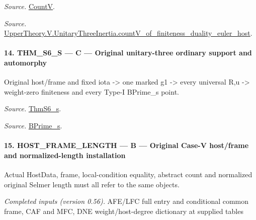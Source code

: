 \documentclass[11pt,a4paper]{article}
\numberwithin{equation}{section}
\theoremstyle{remark}\newtheorem{remark}[theorem]{Remark}
\begin{document}
\emph{Source.} \href{https://github.com/CocoSgt/riemann-hypothesis-lean/blob/7cbf7a0c32fca1badf05931879a37c3f8a2b03b4/src/Development/AutomorphicArithmetic/AutomorphicVarieties/HeightAndVanishing/Counts.lean#L69-L69}{CountV}.

\emph{Source.} \href{https://github.com/CocoSgt/riemann-hypothesis-lean/blob/7cbf7a0c32fca1badf05931879a37c3f8a2b03b4/src/Development/AutomorphicArithmetic/AutomorphicVarieties/ModularityArgument/ThresholdArguments/DenseThresholdCases/CountVOf.lean#L33-L60}{UpperTheory.V.UnitaryThreeInertia.countV\_\allowbreak of\_\allowbreak finiteness\_\allowbreak duality\_\allowbreak euler\_\allowbreak host}.



\paragraph{14. THM\_\allowbreak S6\_\allowbreak S — C — Original unitary-three ordinary support and automorphy}

Original host/frame and fixed iota -> one marked g1 -> every universal R,u -> weight-zero finiteness and every Type-I BPrime\_\allowbreak s point.

\emph{Source.} \href{https://github.com/CocoSgt/riemann-hypothesis-lean/blob/7cbf7a0c32fca1badf05931879a37c3f8a2b03b4/src/Development/AutomorphicArithmetic/AutomorphicVarieties/ModularityArgument/ThresholdArguments/DenseThresholdCases/ThmS6CoreS.lean#L17-L26}{ThmS6\_\allowbreak s}.

\emph{Source.} \href{https://github.com/CocoSgt/riemann-hypothesis-lean/blob/7cbf7a0c32fca1badf05931879a37c3f8a2b03b4/src/Development/AutomorphicArithmetic/AutomorphicVarieties/ModularityArgument/ThresholdArguments/DenseThresholdCases/ThmS6CoreS.lean#L12-L16}{BPrime\_\allowbreak s}.



\paragraph{15. HOST\_\allowbreak FRAME\_\allowbreak LENGTH — B — Original Case-V host/frame and normalized-length installation}

Actual HostData, frame, local-condition equality, abstract count and normalized original Selmer length must all refer to the same objects.

\emph{Completed inputs (version 0.56).} AFE/LFC full entry and conditional common frame, CAF and MFC, DNE weight/host-degree dictionary at supplied tables
\end{document}
